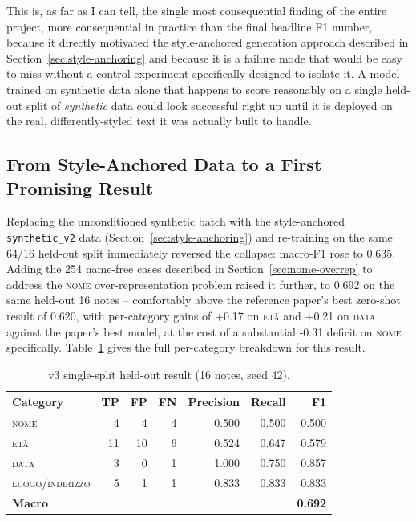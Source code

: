 \documentclass[12pt,a4paper]{report}
\newcommand{\NOME}{\textsc{nome}}
\newcommand{\ETA}{\textsc{et\`a}}
\newcommand{\DATA}{\textsc{data}}
\newcommand{\LUOGO}{\textsc{luogo\slash indirizzo}}
\begin{document}
This is, as far as I can tell, the single most consequential finding of the entire project, more consequential in practice than the final headline F1 number, because it directly motivated the style-anchored generation approach described in Section~\ref{sec:style-anchoring} and because it is a failure mode that would be easy to miss without a control experiment specifically designed to isolate it. A model trained on synthetic data alone that happens to score reasonably on a single held-out split of \emph{synthetic} data could look successful right up until it is deployed on the real, differently-styled text it was actually built to handle.

\subsection{From Style-Anchored Data to a First Promising Result}
\label{sec:v3-single-split}

Replacing the unconditioned synthetic batch with the style-anchored \texttt{synthetic\_v2} data (Section~\ref{sec:style-anchoring}) and re-training on the same 64/16 held-out split immediately reversed the collapse: macro-F1 rose to 0.635. Adding the 254 name-free cases described in Section~\ref{sec:nome-overrep} to address the \NOME{} over-representation problem raised it further, to 0.692 on the same held-out 16 notes -- comfortably above the reference paper's best zero-shot result of 0.620, with per-category gains of +0.17 on \ETA{} and +0.21 on \DATA{} against the paper's best model, at the cost of a substantial -0.31 deficit on \NOME{} specifically. Table~\ref{tab:v3-single-split} gives the full per-category breakdown for this result.

\begin{table}[htbp]
\centering
\caption{v3 single-split held-out result (16 notes, seed 42).}
\label{tab:v3-single-split}
\begin{tabular}{lrrrrrr}
\toprule
Category & TP & FP & FN & Precision & Recall & F1 \\
\midrule
\NOME{} & 4 & 4 & 4 & 0.500 & 0.500 & 0.500 \\
\ETA{} & 11 & 10 & 6 & 0.524 & 0.647 & 0.579 \\
\DATA{} & 3 & 0 & 1 & 1.000 & 0.750 & 0.857 \\
\LUOGO{} & 5 & 1 & 1 & 0.833 & 0.833 & 0.833 \\
\midrule
\textbf{Macro} & & & & & & \textbf{0.692} \\
\bottomrule
\end{tabular}
\end{table}
\end{document}
